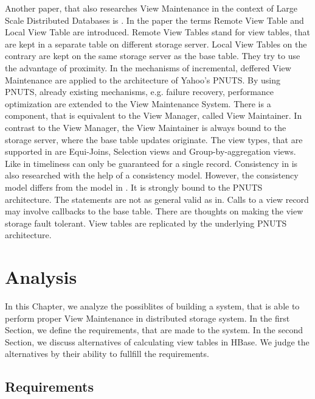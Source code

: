 \documentclass[11pt,a4paper,bibtotoc,idxtotoc,headsepline,footsepline,footexclude,BCOR12mm,DIV13]{scrbook}
\begin{document}
Another paper, that also researches View Maintenance in the context of Large Scale Distributed Databases is \cite{agrawal:asynchronous}.  In the paper the terms Remote View Table and Local View Table are introduced. Remote View Tables stand for view tables, that are kept in a separate table on different storage server. Local View Tables on the contrary are kept on the same storage server as the base table. They try to use the advantage of proximity. In \cite{agrawal:asynchronous} the mechanisms of incremental, deffered View Maintenance are applied to the architecture of Yahoo's PNUTS\cite{cooper:pnuts}. By using PNUTS, already existing mechanisms, e.g. failure recovery, performance optimization are extended to the View Maintenance System. There is a component, that is equivalent to the View Manager, called View Maintainer. In contrast to the View Manager, the View Maintainer is always bound to the storage server, where the base table updates originate. The view types, that are supported in \cite{cooper:pnuts} are Equi-Joins, Selection views and Group-by-aggregation views.
Like in \cite{jacobsen:viewmaintenance} timeliness can only be guaranteed for a single record. Consistency in \cite{agrawal:asynchronous} is also researched with the help of a consistency model. However, the consistency model differs from the model in \cite{jacobsen:viewmaintenance}. It is strongly bound to the PNUTS architecture. The statements are not as general valid as in\cite{jacobsen:viewmaintenance}. Calls to a view record may involve callbacks to the base table. There are thoughts on making the view storage fault tolerant. View tables are replicated by the underlying PNUTS architecture.  


\chapter{Analysis}
\label{chap:analysis}

In this Chapter, we analyze the possiblites of building a system, that is able to perform proper View Maintenance in distributed storage system. In the first Section, we define the requirements, that are made to the system. In the second Section, we discuss alternatives of calculating view tables in HBase. We judge the alternatives by their ability to fullfill the requirements.


\section{Requirements}
\end{document}
